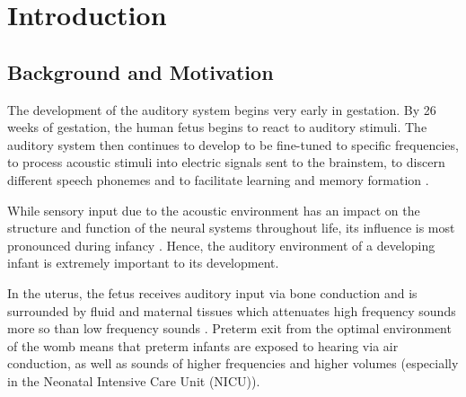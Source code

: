 \section{Introduction}
\label{sec:Introduction}

\subsection{Background and Motivation}

\iftodo
\begin{itemize}[leftmargin=*]
  \begin{itemize}
  \end{itemize}
\end{itemize}
\fi

The development of the auditory system begins very early in gestation. By 26 weeks of gestation, the human fetus begins to react to auditory stimuli. The auditory system then continues to develop to be fine-tuned to specific frequencies, to process acoustic stimuli into electric signals sent to the brainstem, to discern different speech phonemes and to facilitate learning and memory formation \cite{mcmahon_auditory_2012}. 
 
While sensory input due to the acoustic environment has an impact on the structure and function of the neural systems throughout life, its influence is most pronounced during infancy \cite{Dahmen2007}. Hence, the auditory environment of a developing infant is extremely important to its development. 

In the uterus, the fetus receives auditory input via bone conduction and is surrounded by fluid and maternal tissues which attenuates high frequency sounds more so than low frequency sounds \cite{Lahav2015}. Preterm exit from the optimal environment of the womb means that preterm infants are exposed to hearing via air conduction, as well as sounds of higher frequencies and higher volumes (especially in the Neonatal Intensive Care Unit (NICU)). 

